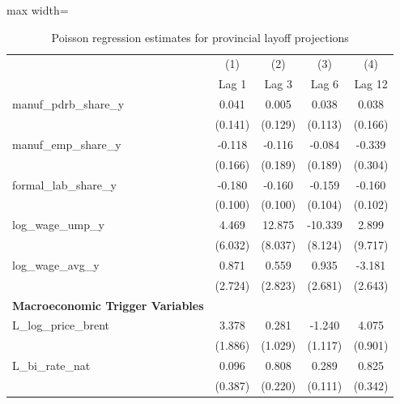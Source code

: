 \begin{table}[H]\centering
\caption{Poisson regression estimates for provincial layoff projections}
\small
\renewcommand{\arraystretch}{1.15}
\begin{adjustbox}{max width=\textwidth}
\begin{tabular}{l*{4}{c}}
\toprule
& (1) & (2) & (3) & (4) \\ & Lag 1 & Lag 3 & Lag 6 & Lag 12 \\ \midrule
manuf\_pdrb\_share\_y&       0.041         &       0.005         &       0.038         &       0.038         \\
            &     (0.141)         &     (0.129)         &     (0.113)         &     (0.166)         \\
manuf\_emp\_share\_y&      -0.118         &      -0.116         &      -0.084         &      -0.339         \\
            &     (0.166)         &     (0.189)         &     (0.189)         &     (0.304)         \\
formal\_lab\_share\_y&      -0.180         &      -0.160         &      -0.159         &      -0.160         \\
            &     (0.100)         &     (0.100)         &     (0.104)         &     (0.102)         \\
log\_wage\_ump\_y&       4.469         &      12.875         &     -10.339         &       2.899         \\
            &     (6.032)         &     (8.037)         &     (8.124)         &     (9.717)         \\
log\_wage\_avg\_y&       0.871         &       0.559         &       0.935         &      -3.181         \\
            &     (2.724)         &     (2.823)         &     (2.681)         &     (2.643)         \\
\addlinespace\textbf{Macroeconomic Trigger Variables}&                     &                     &                     &                     \\
L\_log\_price\_brent&       3.378         &       0.281         &      -1.240         &       4.075\sym{***}\\
            &     (1.886)         &     (1.029)         &     (1.117)         &     (0.901)         \\
L\_bi\_rate\_nat&       0.096         &       0.808\sym{***}&       0.289\sym{**} &       0.825\sym{*}  \\
            &     (0.387)         &     (0.220)         &     (0.111)         &     (0.342)         \\

\end{tabular}
\end{adjustbox}
\end{table}
